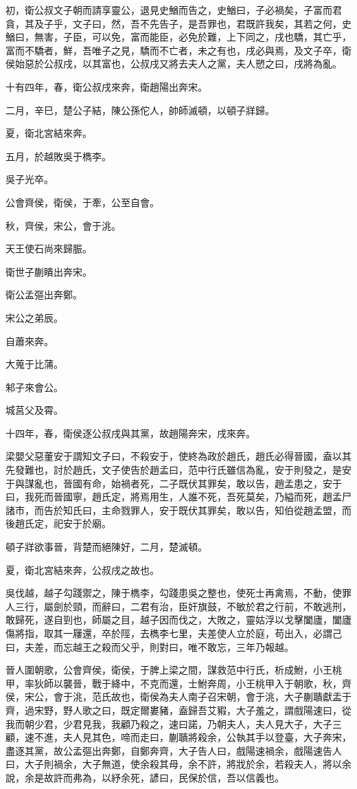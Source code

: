 \begin{pinyinscope}
初，衛公叔文子朝而請享靈公，退見史鰌而告之，史鰌曰，子必禍矣，子富而君貪，其及子乎，文子曰，然，吾不先告子，是吾罪也，君既許我矣，其若之何，史鰌曰，無害，子臣，可以免，富而能臣，必免於難，上下同之，戌也驕，其亡乎，富而不驕者，鮮，吾唯子之見，驕而不亡者，未之有也，戌必與焉，及文子卒，衛侯始惡於公叔戌，以其富也，公叔戌又將去夫人之黨，夫人愬之曰，戌將為亂。

十有四年，春，衛公叔戌來奔，衛趙陽出奔宋。

二月，辛巳，楚公子結，陳公孫佗人，帥師滅頓，以頓子牂歸。

夏，衛北宮結來奔。

五月，於越敗吳于檇李。

吳子光卒。

公會齊侯，衛侯，于牽，公至自會。

秋，齊侯，宋公，會于洮。

天王使石尚來歸脤。

衛世子蒯瞶出奔宋。

衛公孟彄出奔鄭。

宋公之弟辰。

自蕭來奔。

大蒐于比蒲。

邾子來會公。

城莒父及霄。

十四年，春，衛侯逐公叔戌與其黨，故趙陽奔宋，戌來奔。

梁嬰父惡董安于謂知文子曰，不殺安于，使終為政於趙氏，趙氏必得晉國，盍以其先發難也，討於趙氏，文子使告於趙孟曰，范中行氏雖信為亂，安于則發之，是安于與謀亂也，晉國有命，始禍者死，二子既伏其罪矣，敢以告，趙孟患之，安于曰，我死而晉國寧，趙氏定，將焉用生，人誰不死，吾死莫矣，乃縊而死，趙孟尸諸市，而告於知氏曰，主命戮罪人，安于既伏其罪矣，敢以告，知伯從趙孟盟，而後趙氏定，祀安于於廟。

頓子牂欲事晉，背楚而絕陳好，二月，楚滅頓。

夏，衛北宮結來奔，公叔戌之故也。

吳伐越，越子勾踐禦之，陳于檇李，勾踐患吳之整也，使死士再禽焉，不動，使罪人三行，屬劍於頸，而辭曰，二君有治，臣奸旗鼓，不敏於君之行前，不敢逃刑，敢歸死，遂自剄也，師屬之目，越子因而伐之，大敗之，靈姑浮以戈擊闔廬，闔廬傷將指，取其一屨還，卒於陘，去檇李七里，夫差使人立於庭，苟出入，必謂己曰，夫差，而忘越王之殺而父乎，則對曰，唯不敢忘，三年乃報越。

晉人圍朝歌，公會齊侯，衛侯，于脾上梁之間，謀救范中行氏，析成鮒，小王桃甲，率狄師以襲晉，戰于絳中，不克而還，士鮒奔周，小王桃甲入于朝歌，秋，齊侯，宋公，會于洮，范氏故也，衛侯為夫人南子召宋朝，會于洮，大子蒯聵獻盂于齊，過宋野，野人歌之曰，既定爾婁豬，盍歸吾艾豭，大子羞之，謂戲陽速曰，從我而朝少君，少君見我，我顧乃殺之，速曰諾，乃朝夫人，夫人見大子，大子三顧，速不進，夫人見其色，啼而走曰，蒯聵將殺余，公執其手以登臺，大子奔宋，盡逐其黨，故公孟彄出奔鄭，自鄭奔齊，大子告人曰，戲陽速禍余，戲陽速告人曰，大子則禍余，大子無道，使余殺其母，余不許，將戕於余，若殺夫人，將以余說，余是故許而弗為，以紓余死，諺曰，民保於信，吾以信義也。


\end{pinyinscope}
